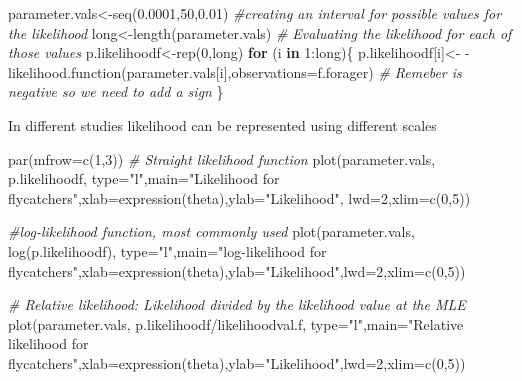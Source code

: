 \documentclass[
]{book}
\newenvironment{Shaded}{\begin{snugshade}}{\end{snugshade}}
\newcommand{\AttributeTok}[1]{\textcolor[rgb]{0.77,0.63,0.00}{#1}}
\newcommand{\CommentTok}[1]{\textcolor[rgb]{0.56,0.35,0.01}{\textit{#1}}}
\newcommand{\ControlFlowTok}[1]{\textcolor[rgb]{0.13,0.29,0.53}{\textbf{#1}}}
\newcommand{\DecValTok}[1]{\textcolor[rgb]{0.00,0.00,0.81}{#1}}
\newcommand{\FloatTok}[1]{\textcolor[rgb]{0.00,0.00,0.81}{#1}}
\newcommand{\FunctionTok}[1]{\textcolor[rgb]{0.00,0.00,0.00}{#1}}
\newcommand{\NormalTok}[1]{#1}
\newcommand{\OtherTok}[1]{\textcolor[rgb]{0.56,0.35,0.01}{#1}}
\newcommand{\SpecialCharTok}[1]{\textcolor[rgb]{0.00,0.00,0.00}{#1}}
\newcommand{\StringTok}[1]{\textcolor[rgb]{0.31,0.60,0.02}{#1}}
\begin{document}
\begin{Shaded}
\begin{Highlighting}[]
\NormalTok{parameter.vals}\OtherTok{\textless{}{-}}\FunctionTok{seq}\NormalTok{(}\FloatTok{0.0001}\NormalTok{,}\DecValTok{50}\NormalTok{,}\FloatTok{0.01}\NormalTok{) }\CommentTok{\#creating an interval for possible values for the likelihood}
\NormalTok{long}\OtherTok{\textless{}{-}}\FunctionTok{length}\NormalTok{(parameter.vals) }
\CommentTok{\# Evaluating the likelihood for each of those values}
\NormalTok{p.likelihoodf}\OtherTok{\textless{}{-}}\FunctionTok{rep}\NormalTok{(}\DecValTok{0}\NormalTok{,long)}
\ControlFlowTok{for}\NormalTok{ (i }\ControlFlowTok{in} \DecValTok{1}\SpecialCharTok{:}\NormalTok{long)\{}
\NormalTok{p.likelihoodf[i]}\OtherTok{\textless{}{-}} \SpecialCharTok{{-}}\FunctionTok{likelihood.function}\NormalTok{(parameter.vals[i],}\AttributeTok{observations=}\NormalTok{f.forager) }\CommentTok{\# Remeber is negative so we need to add a sign}
\NormalTok{\}}
\end{Highlighting}
\end{Shaded}

In different studies likelihood can be represented using different scales

\begin{Shaded}
\begin{Highlighting}[]
\FunctionTok{par}\NormalTok{(}\AttributeTok{mfrow=}\FunctionTok{c}\NormalTok{(}\DecValTok{1}\NormalTok{,}\DecValTok{3}\NormalTok{))}
\CommentTok{\# Straight likelihood function}
\FunctionTok{plot}\NormalTok{(parameter.vals, p.likelihoodf, }\AttributeTok{type=}\StringTok{"l"}\NormalTok{,}\AttributeTok{main=}\StringTok{"Likelihood for flycatchers"}\NormalTok{,}\AttributeTok{xlab=}\FunctionTok{expression}\NormalTok{(theta),}\AttributeTok{ylab=}\StringTok{"Likelihood"}\NormalTok{, }\AttributeTok{lwd=}\DecValTok{2}\NormalTok{,}\AttributeTok{xlim=}\FunctionTok{c}\NormalTok{(}\DecValTok{0}\NormalTok{,}\DecValTok{5}\NormalTok{))}


\CommentTok{\#log{-}likelihood function, most commonly used}
\FunctionTok{plot}\NormalTok{(parameter.vals, }\FunctionTok{log}\NormalTok{(p.likelihoodf), }\AttributeTok{type=}\StringTok{"l"}\NormalTok{,}\AttributeTok{main=}\StringTok{"log{-}likelihood for flycatchers"}\NormalTok{,}\AttributeTok{xlab=}\FunctionTok{expression}\NormalTok{(theta),}\AttributeTok{ylab=}\StringTok{"Likelihood"}\NormalTok{,}\AttributeTok{lwd=}\DecValTok{2}\NormalTok{,}\AttributeTok{xlim=}\FunctionTok{c}\NormalTok{(}\DecValTok{0}\NormalTok{,}\DecValTok{5}\NormalTok{))}

\CommentTok{\# Relative likelihood: Likelihood divided by the likelihood value at the MLE}
\FunctionTok{plot}\NormalTok{(parameter.vals, p.likelihoodf}\SpecialCharTok{/}\NormalTok{likelihoodval.f, }\AttributeTok{type=}\StringTok{"l"}\NormalTok{,}\AttributeTok{main=}\StringTok{"Relative likelihood for flycatchers"}\NormalTok{,}\AttributeTok{xlab=}\FunctionTok{expression}\NormalTok{(theta),}\AttributeTok{ylab=}\StringTok{"Likelihood"}\NormalTok{,}\AttributeTok{lwd=}\DecValTok{2}\NormalTok{,}\AttributeTok{xlim=}\FunctionTok{c}\NormalTok{(}\DecValTok{0}\NormalTok{,}\DecValTok{5}\NormalTok{))}
\end{Highlighting}
\end{Shaded}
\end{document}
